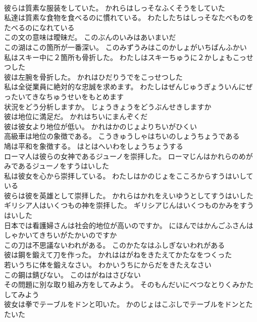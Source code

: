 \documentclass[8pt]{extreport}
\begin{document}
\begin{CJK}{UTF8}{min}
\\	彼らは質素な服装をしていた。	かれらはしっそなふくそうをしていた 
\\	私達は質素な食物を食べるのに慣れている。	わたしたちはしっそなたべものをたべるのになれている 
\\	この文の意味は曖昧だ。	このぶんのいみはあいまいだ 
\\	この湖はこの箇所が一番深い。	このみずうみはこのかしょがいちばんふかい 
\\	私はスキー中に２箇所も骨折した。	わたしはスキーちゅうに２かしょもこっせつした 
\\	彼は左腕を骨折した。	かれはひだりうでをこっせつした 
\\	私は全従業員に絶対的な忠誠を求めます。	わたしはぜんじゅうぎょういんにぜったいてきなちゅうせいをもとめます 
\\	状況をどう分析しますか。	じょうきょうをどうぶんせきしますか 
\\	彼は地位に満足だ。	かれはちいにまんぞくだ 
\\	彼は彼女より地位が低い。	かれはかのじょよりちいがひくい 
\\	高級車は地位の象徴である。	こうきゅうしゃはちいのしょうちょうである 
\\	鳩は平和を象徴する。	はとはへいわをしょうちょうする 
\\	ローマ人は彼らの女神であるジューノを崇拝した。	ローマじんはかれらのめがみであるジューノをすうはいした 
\\	私は彼女を心から崇拝している。	わたしはかのじょをこころからすうはいしている 
\\	彼らは彼を英雄として崇拝した。	かれらはかれをえいゆうとしてすうはいした 
\\	ギリシア人はいくつもの神を崇拝した。	ギリシアじんはいくつものかみをすうはいした 
\\	日本では看護婦さんは社会的地位が高いのですか。	にほんではかんごふさんはしゃかいてきちいがたかいのですか 
\\	この刀は不思議ないわれがある。	このかたなはふしぎないわれがある 
\\	彼は鋼を鍛えて刀を作った。	かれははがねをきたえてかたなをつくった 
\\	若いうちに体を鍛えなさい。	わかいうちにからだをきたえなさい 
\\	この鋼は錆びない。	このはがねはさびない 
\\	その問題に別な取り組み方をしてみよう。	そのもんだいにべつなとりくみかたしてみよう 
\\	彼女は拳でテーブルをドンと叩いた。	かのじょはこぶしでテーブルをドンとたたいた 

\end{CJK}
\end{document}
